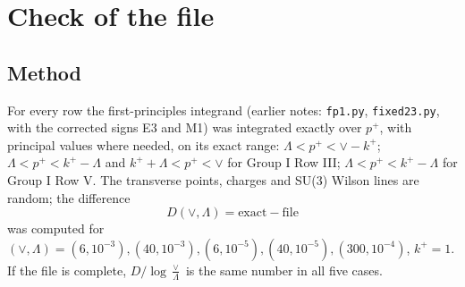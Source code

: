 \documentclass[10pt]{article}
\numberwithin{equation}{section}
\begin{document}
\section{Check of the file}\label{sec:check}
\subsection{Method}
For every row the first-principles integrand (earlier notes: \texttt{fp1.py}, \texttt{fixed23.py}, with the corrected signs E3 and M1) was integrated exactly over $p^+$, with principal values where needed, on its exact range: $\Lambda<p^+<\vee-k^+$; $\Lambda<p^+<k^+-\Lambda$ and $k^++\Lambda<p^+<\vee$ for Group I Row III; $\Lambda<p^+<k^+-\Lambda$ for Group I Row V. The transverse points, charges and SU(3) Wilson lines are random; the difference
\begin{equation*}
D(\vee,\Lambda)=\text{exact}-\text{file}
\end{equation*}
was computed for $(\vee,\Lambda)=(6,10^{-3}),(40,10^{-3}),(6,10^{-5}),(40,10^{-5}),(300,10^{-4})$, $k^+=1$. If the file is complete, $D/\log\frac{\vee}{\Lambda}$ is the same number in all five cases.
\end{document}

